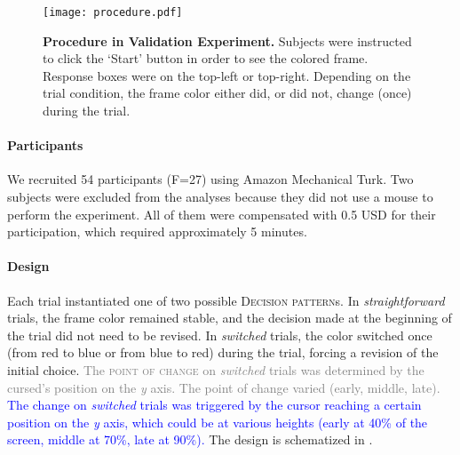\documentclass[draft]{article}
\newcommand{\changeEC}[2]{{\footnotesize\textcolor{gray}{#1}}\textcolor{blue}{#2}}
\begin{document}
\begin{figure}[h]
\centering
\texttt{[image: procedure.pdf]}
\caption{\textbf{Procedure in Validation Experiment.} Subjects were instructed to click the `Start' button in order to see the colored frame. Response boxes were on the top-left or top-right. Depending on the trial condition, the frame color either did, or did not, change (once) during the trial.} \label{fig:procedure.example}
\end{figure}

\paragraph{Participants} We recruited 54 participants (F=27) using Amazon Mechanical Turk. Two subjects were excluded from the analyses because they did not use a mouse to perform the experiment. All of them were compensated with 0.5 USD for their participation, which required approximately 5 minutes. 

\paragraph{Design}
Each trial instantiated one of two possible \textsc{Decision pattern}s. In \textit{straightforward} trials, the frame color remained stable, and the decision made at the beginning of the trial did not need to be revised. In \textit{switched} trials, the color switched once (from red to blue or from blue to red) during the trial, forcing a revision of the initial choice. 
\changeEC{The \textsc{point of change} on \textit{switched} trials was determined by the cursed's position on the \textit{y} axis. The point of change varied (early, middle, late). }{The change on \textit{switched} trials was triggered by the cursor reaching a certain position on the \textit{y} axis, which could be at various heights (early at 40\% of the screen, middle at 70\%, late at 90\%). }
The design is schematized in . 
\end{document}
